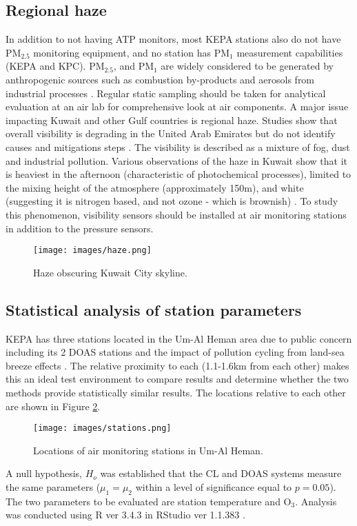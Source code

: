 \subsection{Regional haze}
In addition to not having ATP monitors, most KEPA stations also do not have PM$_{2.5}$ monitoring equipment, and no station has PM$_{1}$ measurement capabilities (KEPA and KPC). PM$_{2.5}$, and PM$_{1}$ are widely considered to be generated by anthropogenic sources such as combustion by-products and aerosols from industrial processes \citep{Squizzato2016}.  Regular static sampling should be taken for analytical evaluation at an air lab for comprehensive look at air components. A major issue impacting Kuwait and other Gulf countries is regional haze. Studies show that overall visibility is degrading in the United Arab Emirates but do not identify causes and mitigations steps \citep{Amal2017}. The visibility is described as a mixture of fog, dust and industrial pollution. Various observations of the haze in Kuwait show that it is heaviest in the afternoon (characteristic of photochemical processes), limited to the mixing height of the atmosphere (approximately 150m), and white (suggesting it is nitrogen based, and not ozone - which is brownish) \citep{Liu2013}. To study this phenomenon, visibility sensors should be installed at air monitoring stations in addition to the pressure sensors.
%
\begin{figure}[H]
\centering
\texttt{[image: images/haze.png]} 
\caption{Haze obscuring Kuwait City skyline.}
\label{fig:haze}
\end{figure}
%

\subsection{Statistical analysis of station parameters}
KEPA has three stations located in the Um-Al Heman area due to public concern including its 2 DOAS stations \citep{Carlisle2010} and the impact of pollution cycling from land-sea breeze effects \cite{Freeman2017}.  The relative proximity to each (1.1-1.6km from each other) makes this an ideal test environment to compare results and determine whether the two methods provide statistically similar results. The locations relative to each other are shown in Figure \ref{fig:stations}.

%
\begin{figure}[H]
\centering
\texttt{[image: images/stations.png]} 
\caption{Locations of air monitoring stations in Um-Al Heman.}
\label{fig:stations}
\end{figure}
%
A null hypothesis, $H_{o}$ was established that the CL and DOAS systems measure the same parameters ($\mu_{1} = \mu_{2}$ within a level of significance equal to $p=0.05$). The two parameters to be evaluated are station temperature and O$_{3}$. Analysis was conducted using R ver 3.4.3 in RStudio ver 1.1.383 \citep{r2013}.

